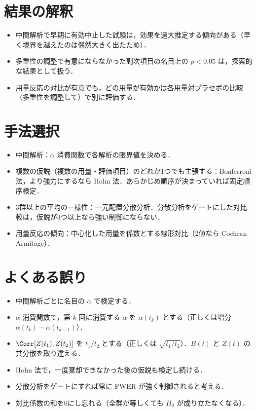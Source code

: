 \section{結果の解釈}\label{sec:14-interp}
\begin{itemize}
\item 中間解析で早期に有効中止した試験は，効果を過大推定する傾向がある（早く境界を越えたのは偶然大きく出たため）．
\item 多重性の調整で有意にならなかった副次項目の名目上の $p<0.05$ は，探索的な結果として扱う．
\item 用量反応の対比が有意でも，どの用量が有効かは各用量対プラセボの比較（多重性を調整して）で別に評価する．
\end{itemize}

\section{手法選択}\label{sec:14-choice}
\begin{itemize}
\item 中間解析：$\alpha$ 消費関数で各解析の限界値を決める．
\item 複数の仮説（複数の用量・評価項目）のどれか1つでも主張する：Bonferroni 法，より強力にするなら Holm 法．あらかじめ順序が決まっていれば固定順序検定．
\item 3群以上の平均の一様性：一元配置分散分析．分散分析をゲートにした対比較は，仮説が3つ以上なら強い制御にならない．
\item 用量反応の傾向：中心化した用量を係数とする線形対比（2値なら Cochran--Armitage）．
\end{itemize}

\section{よくある誤り}\label{sec:14-err}
\begin{warnbox}
\begin{itemize}
\item 中間解析ごとに名目の $\alpha$ で検定する．
\item $\alpha$ 消費関数で，第 $k$ 回に消費する $\alpha$ を $\alpha(t_k)$ とする（正しくは増分 $\alpha(t_k)-\alpha(t_{k-1})$）．
\item $\Corr[Z(t_1),Z(t_2)]$ を $t_1/t_2$ とする（正しくは $\sqrt{t_1/t_2}$）．$B(t)$ と $Z(t)$ の共分散を取り違える．
\item Holm 法で，一度棄却できなかった後の仮説も検定し続ける．
\item 分散分析をゲートにすれば常に FWER が強く制御されると考える．
\item 対比係数の和を0にし忘れる（全群が等しくても $H_0$ が成り立たなくなる）．
\end{itemize}
\end{warnbox}

